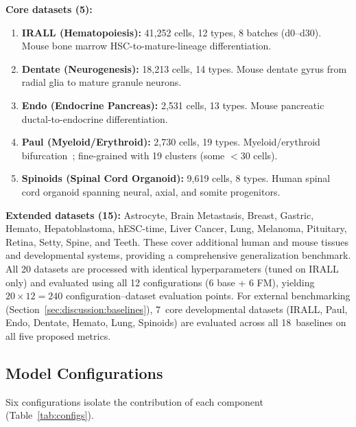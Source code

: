 \documentclass[journal]{IEEEtran}
\begin{document}
\textbf{Core datasets (5):}
\begin{enumerate}
    \item \textbf{IRALL (Hematopoiesis):} 41{,}252 cells, 12 types, 8 batches (d0--d30). Mouse bone marrow HSC-to-mature-lineage differentiation.
    \item \textbf{Dentate (Neurogenesis):} 18{,}213 cells, 14 types. Mouse dentate gyrus from radial glia to mature granule neurons.
    \item \textbf{Endo (Endocrine Pancreas):} 2{,}531 cells, 13 types. Mouse pancreatic ductal-to-endocrine differentiation.
    \item \textbf{Paul (Myeloid/Erythroid):} 2{,}730 cells, 19 types. Myeloid/erythroid bifurcation~\cite{paul2015transcriptional}; fine-grained with 19 clusters (some $< 30$ cells).
    \item \textbf{Spinoids (Spinal Cord Organoid):} 9{,}619 cells, 8 types. Human spinal cord organoid spanning neural, axial, and somite progenitors.
\end{enumerate}

\textbf{Extended datasets (15):} Astrocyte, Brain Metastasis, Breast, Gastric, Hemato, Hepatoblastoma, hESC-time, Liver Cancer, Lung, Melanoma, Pituitary, Retina, Setty, Spine, and Teeth. These cover additional human and mouse tissues and developmental systems, providing a comprehensive generalization benchmark. All 20 datasets are processed with identical hyperparameters (tuned on IRALL only) and evaluated using all 12 configurations (6 base + 6 FM), yielding $20 \times 12 = 240$ configuration--dataset evaluation points. For external benchmarking (Section~\ref{sec:discussion:baselines}), 7~core developmental datasets (IRALL, Paul, Endo, Dentate, Hemato, Lung, Spinoids) are evaluated across all 18~baselines on all five proposed metrics.

\subsection{Model Configurations}
\label{sec:experiments:configs}

Six configurations isolate the contribution of each component (Table~\ref{tab:configs}).
\end{document}
